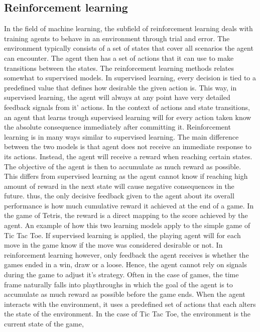 \subsection{Reinforcement learning \label{RL}}

In the field of machine learning, the subfield of reinforcement learning
deals with training agents to behave in an environment through
trial and error. The environment typically consists of a set of states that cover all
scenarios the agent can encounter. The agent then has a set of actions
that it can use to make transitions between the states. 
The reinforcement learning methods relates somewhat 
to supervised models.
In supervised learning, every decision is tied to a predefined value
that defines how desirable the given action is. This way, in supervised learning,
the agent will always at any point have very detailed feedback signals from it' actions.
In the context of actions and state transitions, an agent that learns trough
supervised learning will for every action taken know the absolute consequence
immediately after committing it.
Reinforcement learning is in many ways similar to supervised learning. 
The main difference between the two models is that agent does not receive 
an immediate response to its actions. Instead, the agent will receive a reward
when reaching certain states. The objective of the agent is then to
accumulate as much reward as possible. This differs from supervised learning
as the agent cannot know if reaching high amount of reward in the next state
will cause negative consequences in the future. thus, the only decisive 
feedback given to the agent about its overall performance is 
how much cumulative reward it achieved at the end of a game.
In the game of Tetris, the reward is a direct mapping to 
the score achieved by the agent.
An example of how this two learning models apply to the simple game of
Tic Tac Toe. If supervised learning
is applied, the playing agent will for each move in the game know
if the move was considered desirable or not. 
In reinforcement learning however, only feedback the agent receives
is whether the games ended in a win, draw or a loose. Hence, the agent
cannot rely on signals during the game to adjust it's strategy.
Often in the case of games, the 
time frame naturally falls into playthroughs in which the 
goal of the agent is to accumulate as much reward as possible 
before the game ends.
When the agent interacts 
with the environment, it uses a predefined set of actions
that each alters the state of the environment. In the case of 
Tic Tac Toe, the environment is the current state of the game, 
